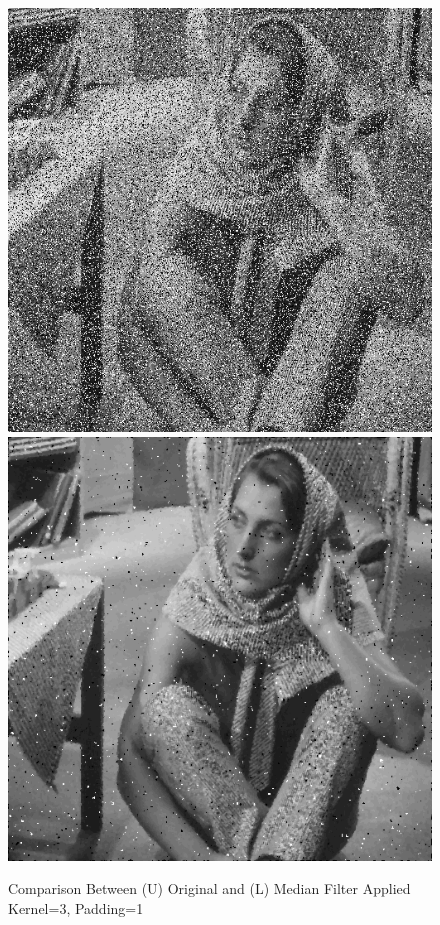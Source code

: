 \documentclass[12pt,a4paper]{report}
\begin{document}
\begin{figure}[!htb]
  \centering
  \includegraphics[height=0.4\paperheight]{test_img/noise1.png}
  \includegraphics[height=0.4\paperheight]{result_img/noise1_q2.png}
  \caption{Comparison Between (U) Original and (L) Median Filter Applied Kernel=3, Padding=1}
\end{figure}
\clearpage
\end{document}

